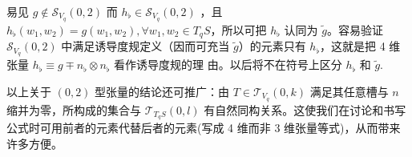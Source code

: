 易见 $g \notin \mathscr{S}_{V_q}(0,2)$ 而 $h_\flat \in \mathscr{S}_{V_q}(0,2)$ ，且 $h_\flat(w_1,w_2)=g (w_1,w_2),\forall w_1,w_2\in T_q S$，所以可把 $h_\flat$ 认同为 $\tilde g$。容易验证 $\mathscr{S}_{V_q}(0,2)$ 中满足诱导度规定义（因而可充当 $\tilde g$）的元素只有 $h_\flat$，这就是把 4 维张量 $h_\flat \equiv g \mp n_\flat\otimes n_\flat$ 看作诱导度规的理 由。以后将不在符号上区分 $h_\flat$ 和 $\tilde g$.

以上关于 $(0,2)$ 型张量的结论还可推广：由 $T\in \mathscr{T}_{V_q}(0,k)$ 满足其任意槽与 $n$ 缩并为零，所构成的集合与 $\mathscr{T}_{T_q S}(0, l)$ 有自然同构关系。这使我们在讨论和书写公式时可用前者的元素代替后者的元素(写成 4 维而非 3 维张量等式)，从而带来许多方便。
